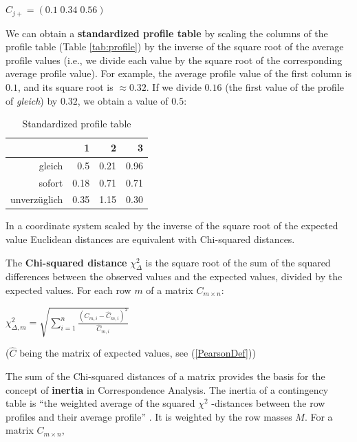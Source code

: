 \begin{paperappendix}
 \begin{exe}
   \ex $\hat{C}_{j+} = (0.1\; 0.34\; 0.56)$
 \end{exe}
%
 We can obtain a \textbf{standardized profile table} by scaling the columns of
 the profile table (Table \ref{tab:profile}) by the inverse of the
 square root of the average profile values (i.e., we divide each value
 by the square root of the corresponding average profile value).
 For example, the average profile value of the first column is $0.1$,
 and its square root is $\approx 0.32$. If we divide $0.16$ (the first
 value of the profile of \textit{gleich}) by $0.32$, we obtain a value of
 $0.5$:

\begin{table}[ht]
\centering
\begin{tabular}{rrrr}
  \hline
 & 1 & 2 & 3 \\ 
  \hline
  gleich & 0.5 & 0.21 & 0.96 \\ 
  sofort & 0.18 & 0.71 & 0.71 \\ 
  unverzüglich & 0.35 & 1.15 & 0.30 \\ 
   \hline
\end{tabular}
\caption{Standardized profile table}
\end{table}
%
In a coordinate system scaled by the inverse of the square root of the expected
value Euclidean distances are equivalent with Chi-squared distances.

The \textbf{Chi-squared distance} $\chi^2_{\Delta}$ is the square root
of the sum of the squared differences between the observed values and
the expected values, divided by the expected values.
%
For each row $m$ of a matrix $C_{m\times n}$:
\begin{exe}
  \ex
  $\chi^2_{\Delta,m} =
  \sqrt{\sum_{i=1}^{n}{\frac{(C_{m,i}-\hat{C}_{m,i})^2}{\hat{C}_{m,i}}}}$

  ($\hat{C}$ being the matrix of expected values, see (\ref{PearsonDef}))

\end{exe}
%
The sum of the Chi-squared distances of a matrix provides the basis
for the concept of \textbf{inertia} in Correspondence Analysis. The
inertia of a contingency table is %
``the weighted average of the squared $\chi^2$ -distances between the
row profiles and their average profile'' \citep[29]{Greenacre2016}. It is 
weighted by the row masses $M$.
For a matrix  $C_{m\times n}$,


\end{paperappendix}
